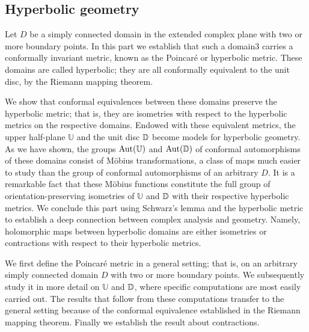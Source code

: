 \subsection{Hyperbolic geometry}
Let $D$ be a simply connected domain in the extended complex plane with two or more boundary points. In this part we establish that such a domain3 carries a conformally invariant metric, known as the Poincar\'e or hyperbolic metric. These domains are called hyperbolic; they are all conformally equivalent to the unit disc, by the Riemann mapping theorem.\par
We show that conformal equivalences between these domains preserve the hyperbolic metric; that is, they are isometries with respect to the hyperbolic metrics on the respective domains. Endowed with these equivalent metrics, the upper half-plane $\mathbb{U}$ and the unit disc $\mathbb{D}$ become models for hyperbolic geometry. As we have shown, the groups $\mathrm{Aut}(\mathbb{U})$ and $\mathrm{Aut}(\mathbb{D})$ of conformal automorphisms of these domains consist of M\"obius transformations, a class of maps much easier to study than the group of conformal automorphisms of an arbitrary $D$. It is a remarkable fact that these M\"obius functions constitute the full group of orientation-preserving isometries of $\mathbb{U}$ and $\mathbb{D}$ with their respective hyperbolic metrics. We conclude this part using Schwarz's lemma and the hyperbolic metric to establish a deep connection between complex analysis and geometry. Namely, holomorphic maps between hyperbolic domains are either isometries or contractions with respect to their hyperbolic metrics.\par
We first define the Poincar\'e metric in a general setting; that is, on an arbitrary simply connected domain $D$ with two or more boundary points. We
subsequently study it in more detail on $\mathbb{U}$ and $\mathbb{D}$, where specific computations are most easily carried out. The results that follow from these computations transfer to the general setting because of the conformal equivalence established in the Riemann mapping theorem. Finally we establish the result about contractions.
